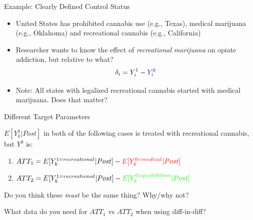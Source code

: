 \documentclass{beamer}
\begin{document}
\begin{frame}{Example: Clearly Defined Control Status}

\begin{itemize}
\item United States has prohibited cannabis use (e.g., Texas), medical marijuana (e.g., Oklahoma) and recreational cannabis (e.g., California)
\item Researcher wants to know the effect of \emph{recreational marijuana} on opiate addiction, but relative to what?  $$\delta_i = Y^1_i - \textcolor{blue}{Y^0_i}$$
\item Note: All states with legalized recreational cannabis started with medical marijuana.  Does that matter?

\end{itemize}

\end{frame}

\begin{frame}{Different Target Parameters}

$E[Y^1_k|Post]$ in both of the following cases is treated with recreational cannabis, but $Y^0$ is:

\begin{enumerate}
\item $ATT_1 = E[Y^{1=recreational}_k|Post] - \textcolor{red}{E[Y^{0=medical}_k|Post]}$ 
\item $ATT_2 = E[Y^{1=recreational}_k|Post] - \textcolor{green}{E[Y^{0=prohibition}_k|Post]}$ 
\end{enumerate}

\bigskip

\bigskip

Do you think these \emph{must} be the same thing?  Why/why not? 

\bigskip

What data do you need for $ATT_1$ vs $ATT_2$ when using diff-in-diff?  

\end{frame}
\end{document}
